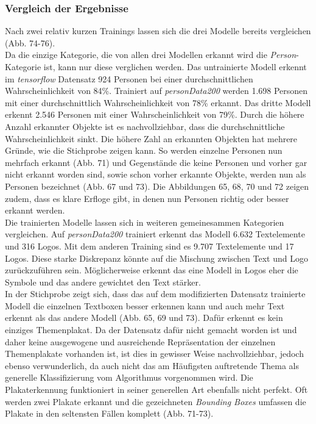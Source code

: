 \documentclass[a4paper,12pt,ngerman]{article}
\begin{document}
\subsubsection{Vergleich der Ergebnisse}

Nach zwei relativ kurzen Trainings lassen sich die drei Modelle bereits vergleichen (Abb. 74-76). \\
Da die einzige Kategorie, die von allen drei Modellen erkannt wird die \textit{Person}-Kategorie ist, kann nur diese verglichen werden. Das untrainierte Modell erkennt im \textit{tensorflow} Datensatz 924 Personen bei einer durchschnittlichen Wahrscheinlichkeit von 84\%. Trainiert auf \textit{personData200} werden 1.698 Personen mit einer durchschnittlich Wahrscheinlichkeit von 78\% erkannt. Das dritte Modell erkennt 2.546 Personen mit einer Wahrscheinlichkeit von 79\%. Durch die höhere Anzahl erkannter Objekte ist es nachvollziehbar, dass die durchschnittliche Wahrscheinlichkeit sinkt. Die höhere Zahl an erkannten Objekten hat mehrere Gründe, wie die Stichprobe zeigen kann. So werden einzelne Personen nun mehrfach erkannt (Abb. 71) und Gegenstände die keine Personen und vorher gar nicht erkannt worden sind, sowie schon vorher erkannte Objekte, werden nun als Personen bezeichnet (Abb. 67 und 73). Die Abbildungen 65, 68, 70 und 72 zeigen zudem, dass es klare Erfloge gibt, in denen nun Personen richtig oder besser erkannt werden. \\
Die trainierten Modelle lassen sich in weiteren gemeinesammen Kategorien vergleichen. Auf \textit{personData200} trainiert erkennt das Modell 6.632 Textelemente und 316 Logos. Mit dem anderen Training sind es 9.707 Textelemente und 17 Logos. Diese starke Diskrepanz könnte auf die Mischung zwischen Text und Logo zurückzuführen sein. Möglicherweise erkennt das eine Modell in Logos eher die Symbole und das andere gewichtet den Text stärker. \\
In der Stichprobe zeigt sich, dass das auf dem modifizierten Datensatz trainierte Modell die einzelnen Textboxen besser erkennen kann und auch mehr Text erkennt als das andere Modell (Abb. 65, 69 und 73). Dafür erkennt es kein einziges Themenplakat. Da der Datensatz dafür nicht gemacht worden ist und daher keine ausgewogene und ausreichende Repräsentation der einzelnen Themenplakate vorhanden ist, ist dies in gewisser Weise nachvollziehbar, jedoch ebenso verwunderlich, da auch nicht das am Häufigsten auftretende Thema als generelle Klassifizierung vom Algorithmus vorgenommen wird. Die Plakaterkennung funktioniert in seiner generellen Art ebenfalls nicht perfekt. Oft werden zwei Plakate erkannt und die gezeichneten \textit{Bounding Boxes} umfassen die Plakate in den seltensten Fällen komplett (Abb. 71-73). \\
\end{document}
